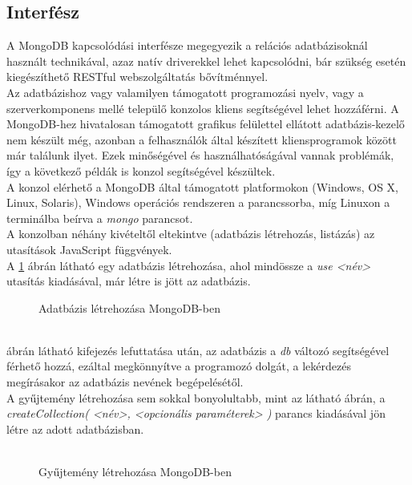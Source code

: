 	\subsection{Interfész}
		A MongoDB kapcsolódási interfésze megegyezik a relációs adatbázisoknál használt technikával, azaz natív driverekkel lehet kapcsolódni, bár szükség esetén kiegészíthető RESTful webszolgáltatás bővítménnyel.\\
		Az adatbázishoz vagy valamilyen támogatott programozási nyelv, vagy a szerverkomponens mellé települő konzolos kliens  segítségével lehet hozzáférni. A MongoDB-hez hivatalosan támogatott grafikus felülettel ellátott adatbázis-kezelő nem készült még, azonban a felhasználók által készített kliensprogramok között már találunk ilyet. Ezek minőségével és használhatóságával vannak problémák, így a következő példák is konzol segítségével készültek.\\
		A konzol elérhető a MongoDB által támogatott platformokon (Windows, OS X, Linux, Solaris), Windows operációs rendszeren a parancssorba, míg Linuxon a terminálba beírva a \emph{mongo} parancsot.
		\hfill\\
		A konzolban néhány kivételtől eltekintve (adatbázis létrehozás, listázás) az utasítások JavaScript függvények.\hfill\\
		A \ref{fig:mongodbcreate} ábrán látható egy adatbázis létrehozása, ahol mindössze a \emph{use <név>} utasítás kiadásával, már létre is jött az adatbázis.
		\\
		\begin{figure}[ht]
			\centering
				
				\caption{Adatbázis létrehozása MongoDB-ben}
				\label{fig:mongodbcreate}
		\end{figure}
		\\
			 ábrán látható kifejezés lefuttatása után, az adatbázis a \emph{db} változó segítségével férhető hozzá, ezáltal megkönnyítve a programozó dolgát, a lekérdezés megírásakor az adatbázis nevének begépelésétől.\\
		A gyűjtemény létrehozása sem sokkal bonyolultabb, mint az látható  ábrán, a \emph{createCollection( <név>, { <opcionális paraméterek> } )} parancs kiadásával jön létre az adott adatbázisban.\\

		\hfill\\
		\begin{figure}[ht]
			\centering
				
				\caption{Gyűjtemény létrehozása MongoDB-ben}
				\label{fig:mongodbcreatecoll}
		\end{figure}
		\\
		
